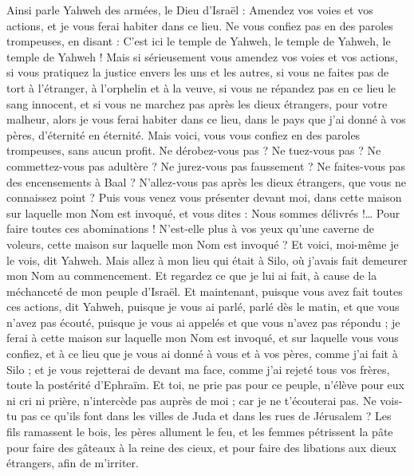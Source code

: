 \begin{multicols}{2}
Ainsi parle Yahweh des armées, le Dieu d'Israël : Amendez vos voies et vos actions, et je vous ferai habiter dans ce lieu.
Ne vous confiez pas en des paroles trompeuses, en disant : C'est ici le temple de Yahweh, le temple de Yahweh, le temple de Yahweh !
Mais si sérieusement vous amendez vos voies et vos actions, si vous pratiquez la justice envers les uns et les autres,
si vous ne faites pas de tort à l'étranger, à l'orphelin et à la veuve, si vous ne répandez pas en ce lieu le sang innocent, et si vous ne marchez pas après les dieux étrangers, pour votre malheur,
alors je vous ferai habiter dans ce lieu, dans le pays que j'ai donné à vos pères, d'éternité en éternité.
Mais voici, vous vous confiez en des paroles trompeuses, sans aucun profit.
Ne dérobez-vous pas ? Ne tuez-vous pas ? Ne commettez-vous pas adultère ? Ne jurez-vous pas faussement ? Ne faites-vous pas des encensements à Baal ? N'allez-vous pas après les dieux étrangers, que vous ne connaissez point ?
Puis vous venez vous présenter devant moi, dans cette maison sur laquelle mon Nom est invoqué, et vous dites : Nous sommes délivrés !… Pour faire toutes ces abominations !
N'est-elle plus à vos yeux qu'une caverne de voleurs, cette maison sur laquelle mon Nom est invoqué ? Et voici, moi-même je le vois, dit Yahweh.
Mais allez à mon lieu qui était à Silo, où j'avais fait demeurer mon Nom au commencement. Et regardez ce que je lui ai fait, à cause de la méchanceté de mon peuple d'Israël.
Et maintenant, puisque vous avez fait toutes ces actions, dit Yahweh, puisque je vous ai parlé, parlé dès le matin, et que vous n'avez pas écouté, puisque je vous ai appelés et que vous n'avez pas répondu ;
je ferai à cette maison sur laquelle mon Nom est invoqué, et sur laquelle vous vous confiez, et à ce lieu que je vous ai donné à vous et à vos pères, comme j'ai fait à Silo ;
et je vous rejetterai de devant ma face, comme j'ai rejeté tous vos frères, toute la postérité d'Ephraïm.
Et toi, ne prie pas pour ce peuple, n'élève pour eux ni cri ni prière, n'intercède pas auprès de moi ; car je ne t'écouterai pas.
Ne vois-tu pas ce qu'ils font dans les villes de Juda et dans les rues de Jérusalem ?
Les fils ramassent le bois, les pères allument le feu, et les femmes pétrissent la pâte pour faire des gâteaux à la reine des cieux, et pour faire des libations aux dieux étrangers, afin de m'irriter.

\end{multicols}
